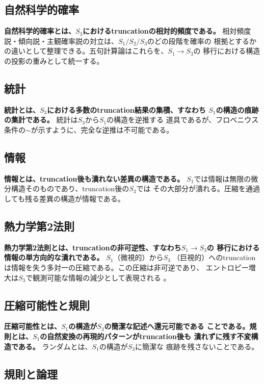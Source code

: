 \documentclass[11pt,a4paper]{ltjsarticle}
\theoremstyle{remark}
\begin{document}
\subsection{自然科学的確率}

\textbf{自然科学的確率とは、$S_3$におけるtruncationの相対的頻度である。}
相対頻度説・傾向説・主観確率説の対立は、$S_1/S_2/S_3$のどの段階を確率の
根拠とするかの違いとして整理できる。五句計算論はこれらを、$S_1\to S_3$の
移行における構造の投影の重みとして統一する。

\subsection{統計}

\textbf{統計とは、$S_3$における多数のtruncation結果の集積、すなわち
$S_1$の構造の痕跡の集計である。} 統計は$S_3$から$S_1$の構造を逆推する
道具であるが、フロベニウス条件の$\sim$が示すように、完全な逆推は不可能である。

\subsection{情報}

\textbf{情報とは、truncation後も潰れない差異の構造である。}
$S_1$では情報は無限の微分構造そのものであり、truncation後の$S_3$では
その大部分が潰れる。圧縮を通過しても残る差異の構造が情報である。

\subsection{熱力学第2法則}

\textbf{熱力学第2法則とは、truncationの非可逆性、すなわち$S_1\to S_3$の
移行における情報の単方向的な潰れである。} $S_1$（微視的）から$S_3$
（巨視的）へのtruncationは情報を失う多対一の圧縮である。この圧縮は非可逆であり、
エントロピー増大は$S_3$で観測可能な情報の減少として表現される
\cite{DuncanSemura2007}。

\subsection{圧縮可能性と規則}

\textbf{圧縮可能性とは、$S_1$の構造が$S_3$の簡潔な記述へ還元可能である
ことである。規則とは、$S_1$の自然変換の再現的パターンがtruncation後も
潰れずに残す不変構造である。} ランダムとは、$S_1$の構造が$S_3$に簡潔な
痕跡を残さないことである。

\subsection{規則と論理}
\end{document}

